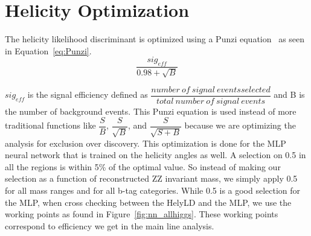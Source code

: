 \section{Helicity Optimization}

The helicity likelihood discriminant is optimized using a Punzi equation~\cite{punzi} as seen in Equation~\ref{eq:Punzi}.
\begin{equation} \dfrac{sig_{eff}}{0.98 + \sqrt{B}} \label{eq:Punzi}\end{equation}

$sig_{eff}$ is the signal efficiency defined as $\dfrac{number\ of\ signal\ events selected}{total\ number\ of\ signal\ events}$ and B is the number of background events.  This Punzi equation is used instead of more traditional functions like $\dfrac{S}{B}$, $\dfrac{S}{\sqrt{B}}$, and $\dfrac{S}{\sqrt{S+B}}$ because we are optimizing the analysis for exclusion over discovery. This optimization is done for the MLP neural network that is trained on the helicity angles as well. A selection on 0.5 in all the regions is within 5\% of the optimal value. So instead of making our selection as a function of reconstructed ZZ invariant mass, we simply apply 0.5 for all mass ranges and for all b-tag categories.  While 0.5 is a good selection for the MLP, when cross checking between the HelyLD and the MLP, we use the working points as found in Figure~\ref{fig:nn_allhiggs}. These working points correspond to efficiency we get in the main line analysis.


